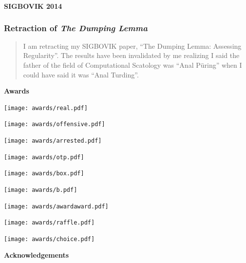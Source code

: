\documentclass{beamer}
\begin{document}
\begin{frame}
\centering
\Huge \textbf{SIGBOVIK 2014}
\end{frame}

\begin{frame}
\frametitle{Retraction of \emph{The Dumping Lemma}}
\begin{quote}
I am retracting my SIGBOVIK paper, ``The Dumping Lemma: Assessing Regularity''.
The results have been invalidated by me realizing I said the father of the field
of Computational Scatology was ``Anal P\" uring'' when I could have said it was
``Anal Turding''.
\end{quote}
\end{frame}

\begin{frame}
\Huge \textbf{Awards}
\end{frame}

\begin{frame}
\texttt{[image: awards/real.pdf]}
\end{frame}
\begin{frame}
\texttt{[image: awards/offensive.pdf]}
\end{frame}
\begin{frame}
\texttt{[image: awards/arrested.pdf]}
\end{frame}
\begin{frame}
\texttt{[image: awards/otp.pdf]}
\end{frame}
\begin{frame}
\texttt{[image: awards/box.pdf]}
\end{frame}
\begin{frame}
\texttt{[image: awards/b.pdf]}
\end{frame}
\begin{frame}
\texttt{[image: awards/awardaward.pdf]}
\end{frame}
\begin{frame}
\texttt{[image: awards/raffle.pdf]}
\end{frame}
\begin{frame}
\texttt{[image: awards/choice.pdf]}
\end{frame}


\begin{frame}
\Huge \textbf{Acknowledgements}
\end{frame}
\end{document}
